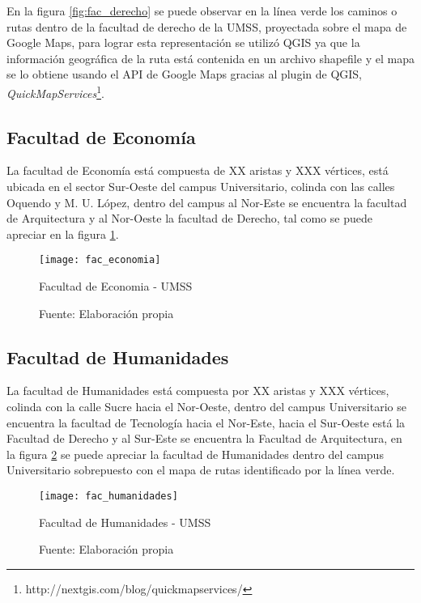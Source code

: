  En la figura \ref{fig:fac_derecho} se puede observar en la línea verde los caminos o rutas dentro de la facultad de derecho de la UMSS, proyectada sobre el mapa de Google Maps, para lograr esta representación se utilizó QGIS ya que la información geográfica de la ruta está contenida en un archivo shapefile y el mapa se lo obtiene usando el API de Google Maps gracias al plugin de QGIS, \emph{QuickMapServices}\footnote{http://nextgis.com/blog/quickmapservices/}.


\subsection{Facultad de Economía}
\label{sub:facultad_economia}

La facultad de Economía está compuesta de XX aristas y XXX vértices, está ubicada en el sector Sur-Oeste del campus Universitario, colinda con las calles Oquendo y M. U. López, dentro del campus al Nor-Este se encuentra la facultad de Arquitectura y al Nor-Oeste la facultad de Derecho, tal como se puede apreciar en la figura \ref{fig:fac_economia}.

\begin{figure}[H]
 \begin{center}
   \texttt{[image: fac\_economia]}
   \caption{Facultad de Economia - UMSS}
   \label{fig:fac_economia}
   \caption*{Fuente: Elaboración propia}
 \end{center}
\end{figure}



\subsection{Facultad de Humanidades}
\label{sub:facultad_humanidades}

La facultad de Humanidades está compuesta por XX aristas y XXX vértices, colinda con la calle Sucre hacia el Nor-Oeste, dentro del campus Universitario se encuentra la facultad de Tecnología hacia el Nor-Este, hacia el Sur-Oeste está la Facultad de Derecho y al Sur-Este se encuentra la Facultad de Arquitectura, en la figura \ref{fig:fac_humanidades} se puede apreciar la facultad de Humanidades dentro del campus Universitario sobrepuesto con el mapa de rutas identificado por la línea verde.

\begin{figure}[H]
 \begin{center}
   \texttt{[image: fac\_humanidades]}
   \caption{Facultad de Humanidades - UMSS}
   \label{fig:fac_humanidades}
   \caption*{Fuente: Elaboración propia}
 \end{center}
\end{figure}


